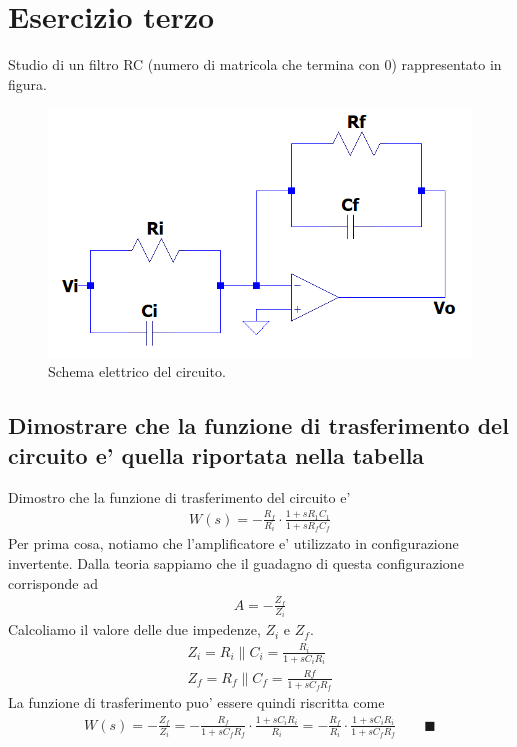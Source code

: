 \documentclass[a4paper,10pt]{article}
\begin{document}
\section{Esercizio terzo}
Studio di un filtro RC (numero di matricola che termina con 0) rappresentato in figura.
\begin{figure}[h!]
	\centering
 	\includegraphics[width=0.5\linewidth]{ckt3.png}
  	\caption{Schema elettrico del circuito.}
  	\label{fig:ckt3}
\end{figure}

\subsection{Dimostrare che la funzione di trasferimento del circuito e' quella riportata nella tabella}
Dimostro che la funzione di trasferimento del circuito e'
\begin{align*}
W(s) = -\frac{R_f}{R_i} \cdot \frac{1+sR_1C_1}{1+sR_fC_f}
\end{align*}
Per prima cosa, notiamo che l'amplificatore e' utilizzato in configurazione invertente. Dalla teoria sappiamo che il guadagno di questa configurazione corrisponde ad
\begin{align*}
A = -\frac{Z_f}{Z_i}
\end{align*}
Calcoliamo il valore delle due impedenze, $Z_i$ e $Z_f$.
\begin{gather*}
Z_i = R_i \parallel C_i = \frac{R_i}{1+sC_iR_i} \\
Z_f = R_f \parallel C_f = \frac{Rf}{1+sC_fR_f}
\end{gather*}
La funzione di trasferimento puo' essere quindi riscritta come
\begin{align*}
W(s) = -\frac{Z_f}{Z_i} = -\frac{R_f}{1+sC_fR_f} \cdot \frac{1+sC_iR_i}{R_i} = -\frac{R_f}{R_i} \cdot \frac{1+sC_iR_i}{1+sC_fR_f}\qquad  \blacksquare
\end{align*}
\pagebreak
\end{document}

